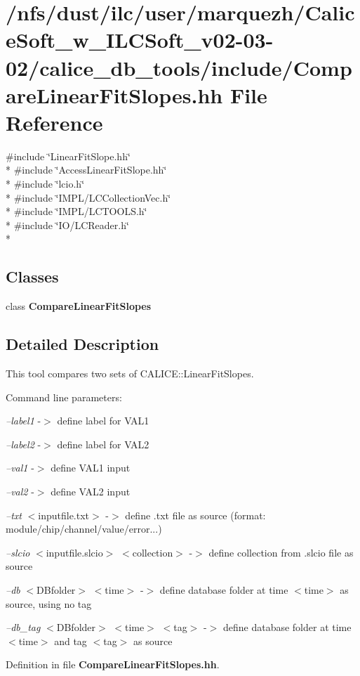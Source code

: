 \section{/nfs/dust/ilc/user/marquezh/\-Calice\-Soft\-\_\-w\-\_\-\-I\-L\-C\-Soft\-\_\-v02-\/03-\/02/calice\-\_\-db\-\_\-tools/include/\-Compare\-Linear\-Fit\-Slopes.hh File Reference}
\label{CompareLinearFitSlopes_8hh}
{\ttfamily \#include \char`\"{}Linear\-Fit\-Slope.\-hh\char`\"{}}\\*
{\ttfamily \#include \char`\"{}Access\-Linear\-Fit\-Slope.\-hh\char`\"{}}\\*
{\ttfamily \#include \char`\"{}lcio.\-h\char`\"{}}\\*
{\ttfamily \#include \char`\"{}I\-M\-P\-L/\-L\-C\-Collection\-Vec.\-h\char`\"{}}\\*
{\ttfamily \#include \char`\"{}I\-M\-P\-L/\-L\-C\-T\-O\-O\-L\-S.\-h\char`\"{}}\\*
{\ttfamily \#include \char`\"{}I\-O/\-L\-C\-Reader.\-h\char`\"{}}\\*
\subsection*{Classes}
\begin{DoxyCompactItemize}
\item 
class {\bf Compare\-Linear\-Fit\-Slopes}
\end{DoxyCompactItemize}


\subsection{Detailed Description}
This tool compares two sets of C\-A\-L\-I\-C\-E\-::\-Linear\-Fit\-Slopes.

Command line parameters\-:\par
\par
 {\itshape --label1} -\/$>$ define label for V\-A\-L1\par
 {\itshape --label2} -\/$>$ define label for V\-A\-L2\par
 {\itshape --val1} -\/$>$ define V\-A\-L1 input\par
 {\itshape --val2} -\/$>$ define V\-A\-L2 input\par
\par
 {\itshape --txt} $<$inputfile.\-txt$>$ -\/$>$ define .txt file as source (format\-: module/chip/channel/value/error...)\par
 {\itshape --slcio} $<$inputfile.\-slcio$>$ $<$collection$>$ -\/$>$ define collection from .slcio file as source\par
 {\itshape --db} $<$D\-Bfolder$>$ $<$time$>$ -\/$>$ define database folder at time $<$time$>$ as source, using no tag\par
 {\itshape --db\-\_\-tag} $<$D\-Bfolder$>$ $<$time$>$ $<$tag$>$ -\/$>$ define database folder at time $<$time$>$ and tag $<$tag$>$ as source\par


Definition in file {\bf Compare\-Linear\-Fit\-Slopes.\-hh}.

